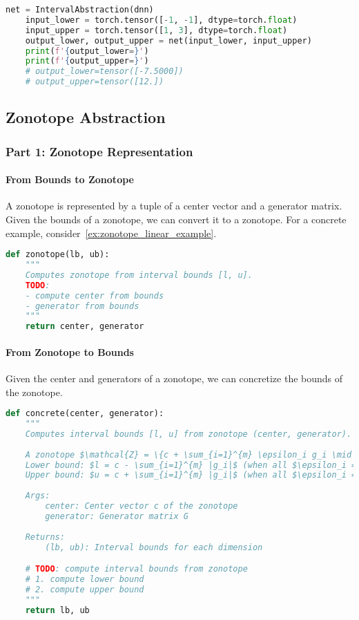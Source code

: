 \begin{lstlisting}[language=Python]
    net = IntervalAbstraction(dnn)
    input_lower = torch.tensor([-1, -1], dtype=torch.float)
    input_upper = torch.tensor([1, 3], dtype=torch.float)
    output_lower, output_upper = net(input_lower, input_upper)
    print(f'{output_lower=}')
    print(f'{output_upper=}')
    # output_lower=tensor([-7.5000])
    # output_upper=tensor([12.])
\end{lstlisting}


\subsection{Zonotope Abstraction}

\subsubsection{Part 1: Zonotope Representation}

\paragraph{From Bounds to Zonotope}

A zonotope is represented by a tuple of a center vector and a generator matrix. 
Given the bounds of a zonotope, we can convert it to a zonotope.
For a concrete example, consider~\autoref{ex:zonotope_linear_example}.
\begin{lstlisting}[language=Python]
def zonotope(lb, ub):
    """
    Computes zonotope from interval bounds [l, u].
    TODO: 
    - compute center from bounds
    - generator from bounds
    """
    return center, generator
\end{lstlisting}

\paragraph{From Zonotope to Bounds}

Given the center and generators of a zonotope, we can concretize the bounds of the zonotope.
\begin{lstlisting}[language=Python]
def concrete(center, generator):
    """
    Computes interval bounds [l, u] from zonotope (center, generator).
    
    A zonotope $\mathcal{Z} = \{c + \sum_{i=1}^{m} \epsilon_i g_i \mid \epsilon_i \in [-1,1]\}$ can be converted to interval bounds:
    Lower bound: $l = c - \sum_{i=1}^{m} |g_i|$ (when all $\epsilon_i = -\text{sign}(g_i)$)
    Upper bound: $u = c + \sum_{i=1}^{m} |g_i|$ (when all $\epsilon_i = +\text{sign}(g_i)$)
    
    Args:
        center: Center vector c of the zonotope
        generator: Generator matrix G 
        
    Returns:
        (lb, ub): Interval bounds for each dimension

    # TODO: compute interval bounds from zonotope
    # 1. compute lower bound
    # 2. compute upper bound
    """
    return lb, ub
    
\end{lstlisting}

